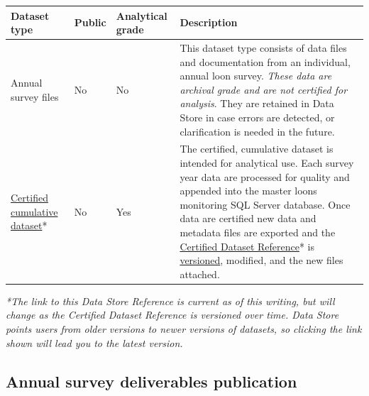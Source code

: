 \documentclass[
  letterpaper,
  DIV=11,
  numbers=noendperiod]{scrreprt}
\begin{document}
\begin{longtable}[]{@{}
  >{\raggedright\arraybackslash}p{}
  >{\raggedright\arraybackslash}p{}
  >{\raggedright\arraybackslash}p{}
  >{\raggedright\arraybackslash}p{}@{}}
\toprule\noalign{}
\begin{minipage}[b]{\linewidth}\raggedright
Dataset type
\end{minipage} & \begin{minipage}[b]{\linewidth}\raggedright
Public
\end{minipage} & \begin{minipage}[b]{\linewidth}\raggedright
Analytical grade
\end{minipage} & \begin{minipage}[b]{\linewidth}\raggedright
Description
\end{minipage} \\
\midrule\noalign{}
\endhead
\bottomrule\noalign{}
\endlastfoot
Annual survey files & No & No & This dataset type consists of data files
and documentation from an individual, annual loon survey. \emph{These
data are archival grade and are not certified for analysis}. They are
retained in Data Store in case errors are detected, or clarification is
needed in the future. \\
\href{https://irma.nps.gov/DataStore/Reference/Profile/2316912}{Certified
cumulative dataset}* & No & Yes & The certified, cumulative dataset is
intended for analytical use. Each survey year data are processed for
quality and appended into the master loons monitoring SQL Server
database. Once data are certified new data and metadata files are
exported and the
\href{https://irma.nps.gov/DataStore/Reference/Profile/2316912}{Certified
Dataset Reference}* is
\href{https://irma.nps.gov/DataStore/DownloadFile/717239}{versioned},
modified, and the new files attached. \\
\end{longtable}

\emph{*The link to this Data Store Reference is current as of this
writing, but will change as the Certified Dataset Reference is versioned
over time. Data Store points users from older versions to newer versions
of datasets, so clicking the link shown will lead you to the latest
version.}

\subsection{Annual survey deliverables
publication}\label{annual-survey-deliverables-publication}
\end{document}
